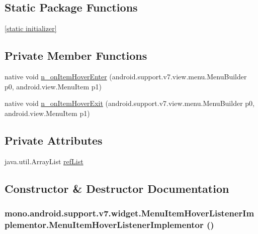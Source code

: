 \subsection*{Static Package Functions}
\begin{CompactItemize}
\item 
\hyperlink{classmono_1_1android_1_1support_1_1v7_1_1widget_1_1_menu_item_hover_listener_implementor_410d4342a5ba1ff9c4fcd2209018a958}{\mbox{[}static initializer\mbox{]}}
\end{CompactItemize}
\subsection*{Private Member Functions}
\begin{CompactItemize}
\item 
native void \hyperlink{classmono_1_1android_1_1support_1_1v7_1_1widget_1_1_menu_item_hover_listener_implementor_7d7a82ab52f5706528313480aa895ecb}{n\_\-onItemHoverEnter} (android.support.v7.view.menu.MenuBuilder p0, android.view.MenuItem p1)
\item 
native void \hyperlink{classmono_1_1android_1_1support_1_1v7_1_1widget_1_1_menu_item_hover_listener_implementor_9c23f6ab665b3fade1ede25afe7652af}{n\_\-onItemHoverExit} (android.support.v7.view.menu.MenuBuilder p0, android.view.MenuItem p1)
\end{CompactItemize}
\subsection*{Private Attributes}
\begin{CompactItemize}
\item 
java.util.ArrayList \hyperlink{classmono_1_1android_1_1support_1_1v7_1_1widget_1_1_menu_item_hover_listener_implementor_2e32c04072bc4e744982df57b0aa84e7}{refList}
\end{CompactItemize}


\subsection{Constructor \& Destructor Documentation}
\hypertarget{classmono_1_1android_1_1support_1_1v7_1_1widget_1_1_menu_item_hover_listener_implementor_f6d28098186fde573ac88f118bdab874}{
\subsubsection[{MenuItemHoverListenerImplementor}]{\setlength{\rightskip}{0pt plus 5cm}mono.android.support.v7.widget.MenuItemHoverListenerImplementor.MenuItemHoverListenerImplementor ()}}
\label{classmono_1_1android_1_1support_1_1v7_1_1widget_1_1_menu_item_hover_listener_implementor_f6d28098186fde573ac88f118bdab874}




